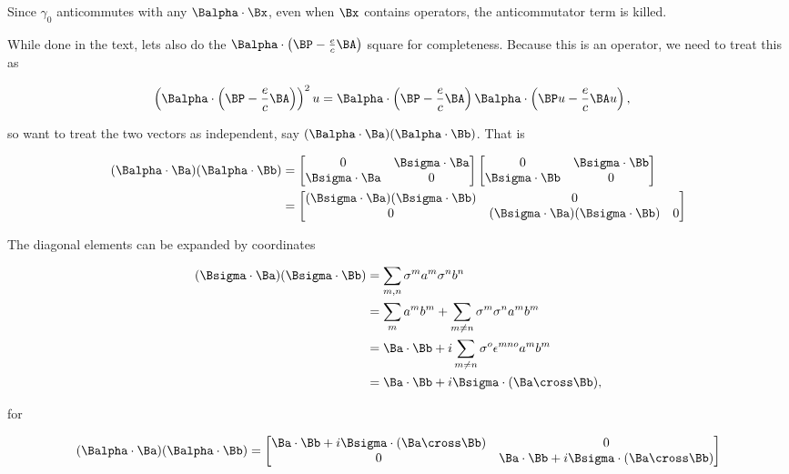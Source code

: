 Since $\gamma_0$ anticommutes with any $\Balpha \cdot \Bx$, even when $\Bx$ contains operators, the anticommutator term is killed.

While done in the text, lets also do the $\Balpha \cdot \left(\BP - \frac{e}{c} \BA \right)$ square for completeness.  Because this is an operator, we need to treat this as

\begin{align*}
\left( \Balpha \cdot \left(\BP - \frac{e}{c} \BA \right) \right)^2 u
&=
\Balpha \cdot \left(\BP - \frac{e}{c} \BA \right)
\Balpha \cdot \left(\BP u - \frac{e}{c} \BA u \right),
\end{align*}

so want to treat the two vectors as independent, say $(\Balpha \cdot \Ba)(\Balpha \cdot \Bb)$.  That is

\begin{align*}
(\Balpha \cdot \Ba)(\Balpha \cdot \Bb)
&=
\begin{bmatrix}
0 & \Bsigma \cdot \Ba \\
\Bsigma \cdot \Ba & 0
\end{bmatrix}
\begin{bmatrix}
0 & \Bsigma \cdot \Bb \\
\Bsigma \cdot \Bb & 0
\end{bmatrix} \\
&=
\begin{bmatrix}
(\Bsigma \cdot \Ba) (\Bsigma \cdot \Bb)  & 0 \\
0 & (\Bsigma \cdot \Ba) (\Bsigma \cdot \Bb)  & 0 \\
\end{bmatrix} \\
\end{align*}

The diagonal elements can be expanded by coordinates

\begin{align*}
(\Bsigma \cdot \Ba) (\Bsigma \cdot \Bb)
&=
\sum_{m,n} \sigma^m a^m \sigma^n b^n \\
&=
\sum_m a^m b^m
+
\sum_{m\ne n} \sigma^m \sigma^n a^m b^m \\
&=
\Ba \cdot \Bb
+
i \sum_{m\ne n} \sigma^o \epsilon^{m n o} a^m b^m \\
&=
\Ba \cdot \Bb
+
i \Bsigma \cdot (\Ba \cross \Bb),
\end{align*}

for

\begin{equation}\label{eqn:diracGauge:360}
(\Balpha \cdot \Ba)(\Balpha \cdot \Bb)
=
\begin{bmatrix}
\Ba \cdot \Bb + i \Bsigma \cdot (\Ba \cross \Bb) & 0 \\
0 & \Ba \cdot \Bb + i \Bsigma \cdot (\Ba \cross \Bb)
\end{bmatrix}
\end{equation}

